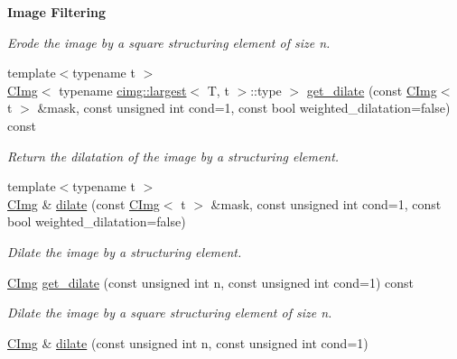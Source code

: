 \begin{Indent}{\bf Image Filtering}
\begin{DoxyCompactItemize}
\begin{DoxyCompactList}\small\item\em Erode the image by a square structuring element of size n. \item\end{DoxyCompactList}\item 
\hypertarget{structcimg__library_1_1_c_img_af9560e3c8cc0190079bbd73937c7d427}{
{\footnotesize template$<$typename t $>$ }\\\hyperlink{structcimg__library_1_1_c_img}{CImg}$<$ typename \hyperlink{structcimg__library_1_1cimg_1_1largest}{cimg::largest}$<$ T, t $>$::type $>$ \hyperlink{structcimg__library_1_1_c_img_af9560e3c8cc0190079bbd73937c7d427}{get\_\-dilate} (const \hyperlink{structcimg__library_1_1_c_img}{CImg}$<$ t $>$ \&mask, const unsigned int cond=1, const bool weighted\_\-dilatation=false) const }
\label{structcimg__library_1_1_c_img_af9560e3c8cc0190079bbd73937c7d427}

\begin{DoxyCompactList}\small\item\em Return the dilatation of the image by a structuring element. \item\end{DoxyCompactList}\item 
{\footnotesize template$<$typename t $>$ }\\\hyperlink{structcimg__library_1_1_c_img}{CImg} \& \hyperlink{structcimg__library_1_1_c_img_a8d08e0d21eac13efcc468e3d8c9a0c96}{dilate} (const \hyperlink{structcimg__library_1_1_c_img}{CImg}$<$ t $>$ \&mask, const unsigned int cond=1, const bool weighted\_\-dilatation=false)
\begin{DoxyCompactList}\small\item\em Dilate the image by a structuring element. \item\end{DoxyCompactList}\item 
\hypertarget{structcimg__library_1_1_c_img_a093d140e06d642c9087bb9686c3abb59}{
\hyperlink{structcimg__library_1_1_c_img}{CImg} \hyperlink{structcimg__library_1_1_c_img_a093d140e06d642c9087bb9686c3abb59}{get\_\-dilate} (const unsigned int n, const unsigned int cond=1) const }
\label{structcimg__library_1_1_c_img_a093d140e06d642c9087bb9686c3abb59}

\begin{DoxyCompactList}\small\item\em Dilate the image by a square structuring element of size n. \item\end{DoxyCompactList}\item 
\hypertarget{structcimg__library_1_1_c_img_abb250fc736ffe2f047e8750ecaef5b3a}{
\hyperlink{structcimg__library_1_1_c_img}{CImg} \& \hyperlink{structcimg__library_1_1_c_img_abb250fc736ffe2f047e8750ecaef5b3a}{dilate} (const unsigned int n, const unsigned int cond=1)}
\label{structcimg__library_1_1_c_img_abb250fc736ffe2f047e8750ecaef5b3a}


\end{DoxyCompactItemize}
\end{Indent}
